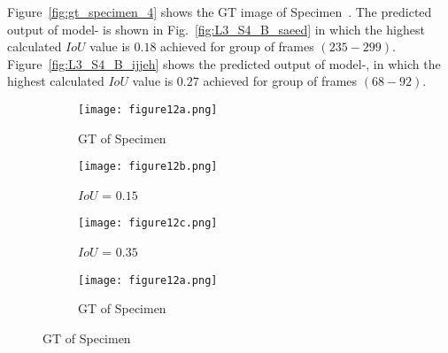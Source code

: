 Figure~\ref{fig:gt_specimen_4} shows the GT image of Specimen~.
The predicted output of model- is shown in Fig.~\ref{fig:L3_S4_B_saeed} in which the highest calculated \(IoU\) value is \(0.18\) achieved for group of frames \((235-299)\).
Figure~\ref{fig:L3_S4_B_ijjeh} shows the predicted output of model-, in which the highest calculated \(IoU\) value is \(0.27\) achieved for group of frames \((68-92)\).
\begin{figure} [!h]
	\centering
	\begin{subfigure}[b]{0.32\textwidth}
		\centering
		\texttt{[image: figure12a.png]}
		\caption{GT of Specimen~}
		\label{fig:gt_specimen_2}
	\end{subfigure}
	\hfill
	\begin{subfigure}[b]{0.32\textwidth}
		\centering
		\texttt{[image: figure12b.png]}
		\caption{\(IoU\) = \(0.15\)} 
		\label{fig:L3_S2_B_saeed}
	\end{subfigure}
	\hfill
	\begin{subfigure}[b]{0.32\textwidth}
		\centering
		\texttt{[image: figure12c.png]}
		\caption{\(IoU\) = \(0.35\)} 
		\label{fig:L3_S2_B_ijjeh}
	\end{subfigure}
	\par\medskip
	\begin{subfigure}[b]{0.32\textwidth}
		\centering
		\texttt{[image: figure12a.png]}
		\caption{GT of Specimen~}
		\label{fig:gt_specimen_3}
	\end{subfigure}

\end{figure}
